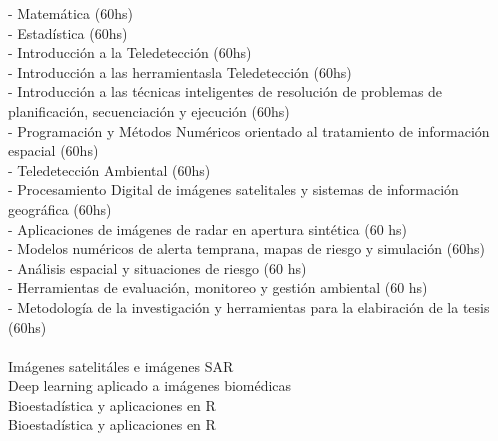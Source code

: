 \documentclass[
	a4paper,
]{fortysecondscv}
\begin{document}
\begin{cvtable}[1.5]
	{
	- Matemática (60hs) \\
	- Estadística (60hs)\\
	- Introducción a la Teledetección (60hs)\\
	- Introducción a las herramientasla Teledetección (60hs)\\
	- Introducción a las técnicas inteligentes de resolución de problemas de planificación, secuenciación y ejecución (60hs)\\
	- Programación y Métodos Numéricos orientado al tratamiento de información espacial (60hs)\\
	- Teledetección Ambiental (60hs)\\
	- Procesamiento Digital de imágenes satelitales y sistemas de información geográfica (60hs)\\
	- Aplicaciones de imágenes de radar en apertura sintética (60 hs)\\
	- Modelos numéricos de alerta temprana, mapas de riesgo y simulación (60hs)\\
	- Análisis espacial y situaciones de riesgo (60 hs)\\
	- Herramientas de evaluación, monitoreo y gestión ambiental (60 hs)\\
	- Metodología de la investigación y herramientas para la elabiración de la tesis (60hs)\\
	}
	\\
	{Imágenes satelitáles e imágenes SAR}
	\\
	{Deep learning aplicado a imágenes biomédicas}
	\\
	{Bioestadística y aplicaciones en R}
	\\
	{Bioestadística y aplicaciones en R}
		\\
\end{cvtable}


	
\begin{cvtable}[1.5]
	{}
	\\
	{}
	\\
	{}
	\\
	\\
	{}
	\\
	\\
	{}
	\\
\end{cvtable}
\end{document}
